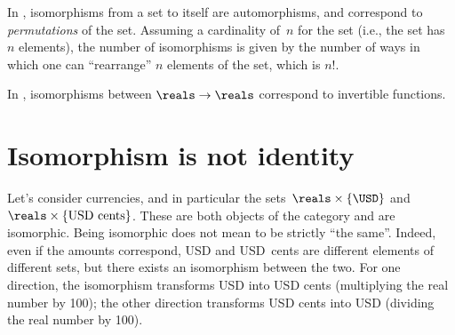 \begin{example}
In \FinSet, isomorphisms from a set to itself are automorphisms, and correspond to \emph{permutations} of the set. Assuming a cardinality of~$n$ for the set (i.e., the set has~$n$ elements), the number of isomorphisms is given by the number of ways in which one can ``rearrange'' $n$ elements of the set, which is $n!$.
\end{example}

\begin{example}
In \Set, isomorphisms between $\reals\to \reals$ correspond to invertible functions.
\end{example}


\section{Isomorphism is not identity}
\begin{example}
Let's consider currencies, and in particular the sets~$\reals\times \{\USD\}$ and~$\reals\times \{\text{USD cents}\}$. These are both objects of the category \Curr and are isomorphic. Being isomorphic does not mean to be strictly ``the same''. Indeed, even if the amounts correspond, \unit[10]{USD} and \unit[1,000]{USD cents} are different elements of different sets, but there exists an isomorphism between the two. For one direction, the isomorphism transforms USD into USD cents (multiplying the real number by 100); the other direction transforms USD cents into USD (dividing the real number by 100).
\end{example}










